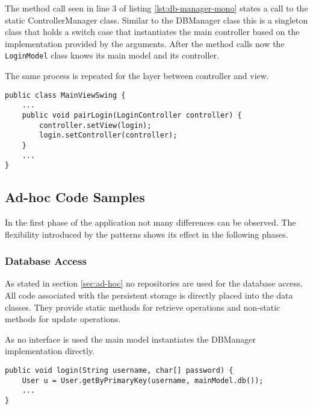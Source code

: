 The method call seen in line 3 of listing \ref{lst:db-manager-mono} states a call to the static ControllerManager class. Similar to the DBManager class this is a singleton class that holds a switch case that instantiates the main controller based on the implementation provided by the arguments. After the method calls now the \texttt{LoginModel} class knows its main model and its controller. 

\clearpage

The same process is repeated for the layer between controller and view. 

\begin{lstlisting}[caption={Code snipped showing pairing code between a sub-controller and a sub-view. The pairing between the model and controller layer works in a very similar way.}, captionpos=b, label={lst:pairing}]
public class MainViewSwing {
	...
	public void pairLogin(LoginController controller) {
		controller.setView(login);
		login.setController(controller);
	}
	...
}
\end{lstlisting}
   
\subsection{Ad-hoc Code Samples}
In the first phase of the application not many differences can be observed. The flexibility introduced by the patterns shows its effect in the following phases. 

\subsubsection{Database Access}
As stated in section \ref{sec:ad-hoc} no repositories are used for the database access. All code associated with the persistent storage is directly placed into the data classes. They provide static methods for retrieve operations and non-static methods for update operations. 

As no interface is used the main model instantiates the DBManager implementation directly. 

\begin{lstlisting}[caption={Code snipped showing database access in the ad-hoc program version. All database code is placed into the corresponding data class, retrieval methods are static and take the corresponding DBManager as parameter. The reference to the DBManager is provided by a getter method of the main model, as in listing \ref{lst:db-access-bp}.}, captionpos=b]
public void login(String username, char[] password) {
	User u = User.getByPrimaryKey(username, mainModel.db()); 
	...
}
\end{lstlisting}

